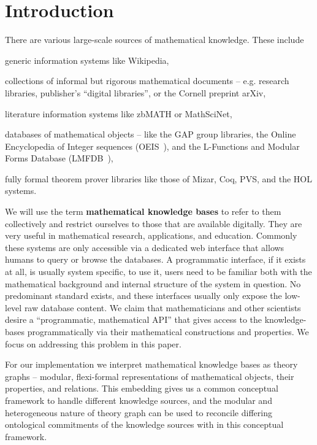 \section{Introduction}\label{sec:intro}

There are various large-scale sources of mathematical knowledge.  These include
\begin{compactitem}
\item generic information systems like Wikipedia,
\item collections of informal but rigorous mathematical documents -- e.g. research libraries, publisher's ``digital libraries'', or the Cornell preprint arXiv,
\item literature information systems like zbMATH or MathSciNet,
\item databases of mathematical objects -- like the GAP group libraries, the Online Encyclopedia of Integer sequences (OEIS~\cite{Sloane:OEIS,oeis}), and the L-Functions and Modular Forms Database (LMFDB~\cite{Cremona:LMFDB16,lmfdb:on}),
\item fully formal theorem prover libraries like those of Mizar, Coq, PVS, and the HOL systems.
\end{compactitem}
  
We will use the term \textbf{mathematical knowledge bases} to refer to them collectively and restrict ourselves to those that are available digitally.
They are very useful in mathematical research, applications, and education.  
Commonly these systems are only accessible via a dedicated web interface that allows humans to query or browse the databases. 
A programmatic interface, if it exists at all, is usually system specific, to use it, users need to be familiar both with the mathematical background and internal structure of the system in question.  
No predominant standard exists, and these interfaces usually only expose the low-level raw database content.
We claim that mathematicians and other scientists desire a ``programmatic, mathematical API'' that gives access to the knowledge-bases programmatically via their mathematical constructions and properties. 
We focus on addressing this problem in this paper. 

For our implementation we interpret mathematical knowledge bases as \ommt theory graphs -- modular, flexi-formal representations of mathematical objects, their properties, and relations. 
This embedding gives us a common conceptual framework to handle different knowledge sources, and the modular and heterogeneous nature of \ommt theory graph can be used to reconcile differing ontological commitments of the knowledge sources with in this conceptual framework.

